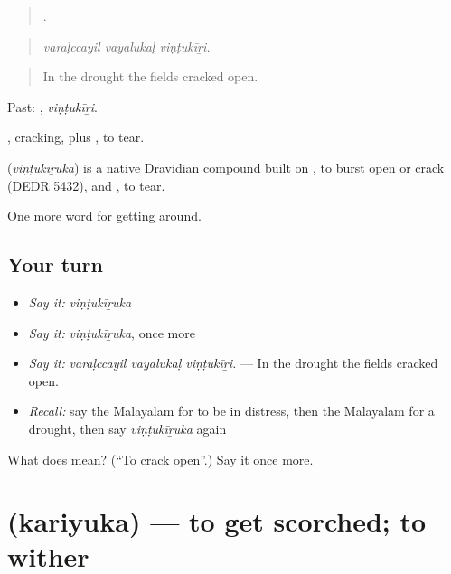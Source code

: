 \begin{quote}
  .
\end{quote}

\begin{quote}
\emph{varaḷccayil vayalukaḷ viṇṭukīṟi.}
\end{quote}

\begin{quote}
In the drought the fields cracked open.
\end{quote}

Past: , \emph{viṇṭukīṟi}.

, cracking, plus , to tear.

\begin{cousinweb}
\textbf{} (\emph{viṇṭukīṟuka}) is a native Dravidian compound built on , to burst open or crack (DEDR 5432), and , to tear.
\end{cousinweb}

\begin{grammarlens}[title={What you've built}]
One more word for getting around.
\end{grammarlens}

\subsection*{Your turn}
\begin{itemize}
\raggedright
  \item \emph{Say it:} \emph{viṇṭukīṟuka}
  \item \emph{Say it:} \emph{viṇṭukīṟuka}, once more
  \item \emph{Say it:} \emph{varaḷccayil vayalukaḷ viṇṭukīṟi.} — In the drought the fields cracked open.
  \item \emph{Recall:} say the Malayalam for to be in distress, then the Malayalam for a drought, then say \emph{viṇṭukīṟuka} again
\end{itemize}

\begin{tcolorbox}[breakable,colback=teal!4,colframe=teal!35!black,title={Before you move on}]
What does  mean? (\textquotedblleft{}To crack open\textquotedblright{}.) Say it once more.
\end{tcolorbox}
\section[\texorpdfstring{\ml{കരിയുക} (kariyuka)}{കരിയുക (kariyuka)}]{ (kariyuka) — to get scorched; to wither}

